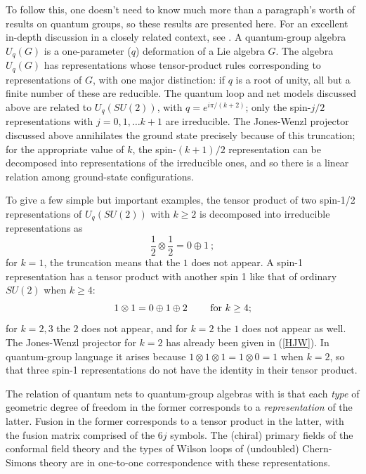 \documentclass[11pt]{article}
\begin{document}
To follow this, one doesn't need to know much more than a paragraph's
worth of results on quantum groups, so these results are presented
here. For an excellent in-depth discussion in a closely related
context, see \cite{Bais}. A quantum-group algebra $U_q(G)$ is a
one-parameter ($q$) deformation of a Lie algebra $G$. The algebra
$U_q(G)$ has representations whose tensor-product rules corresponding to
representations of $G$, with one major distinction: if $q$ is a root of unity,
all but a finite number of these are reducible.  The quantum loop and
net models discussed above are related to $U_q(SU(2))$, with
$q=e^{i\pi/(k+2)}$; only the spin-$j/2$ representations with
$j=0,1,\dots k+1$ are irreducible. The
Jones-Wenzl projector discussed above annihilates the ground state
precisely because of this truncation; for the appropriate value of
$k$, the spin-$(k+1)/2$ representation can be
decomposed into representations of the irreducible ones, and so there
is a linear relation among ground-state configurations.

To give a few simple but important examples, the tensor product of two
spin-1/2 representations of $U_q(SU(2))$ with $k\ge 2$ is decomposed
into irreducible representations as
\begin{equation}
\frac{1}{2} \otimes \frac{1}{2} = 0 \oplus 1\ ;
\label{spinhalf}
\end{equation}
for $k=1$, the truncation means that the $1$ does not appear.  A
spin-1 representation has a tensor product with another spin 1 like
that of ordinary $SU(2)$ when $k\ge 4$:
\begin{equation}
1 \otimes 1 = 0 \oplus 1 \oplus 2 \qquad\hbox{ for }k\ge 4;
\label{spin1}
\end{equation}
for $k=2,3$ the $2$ does not appear, and for $k=2$ the $1$ does not
appear as well. 
The Jones-Wenzl projector for $k=2$ has already been
given in (\ref{HJW}). In quantum-group language it arises because
$1\otimes 1 \otimes 1 = 1\otimes 0 = 1$ when $k=2$, so that three
spin-1 representations do not have the identity in their tensor product.


The relation of quantum nets to quantum-group algebras with is that
each {\em type} of geometric degree of freedom in the former
corresponds to a {\em representation} of the latter.  Fusion in the
former corresponds to a tensor product in the latter, with the fusion
matrix comprised of the 6$j$ symbols.  The (chiral) primary
fields of the conformal field theory and the types of Wilson loops of
(undoubled) Chern-Simons theory are in one-to-one correspondence with
these representations.
\end{document}

